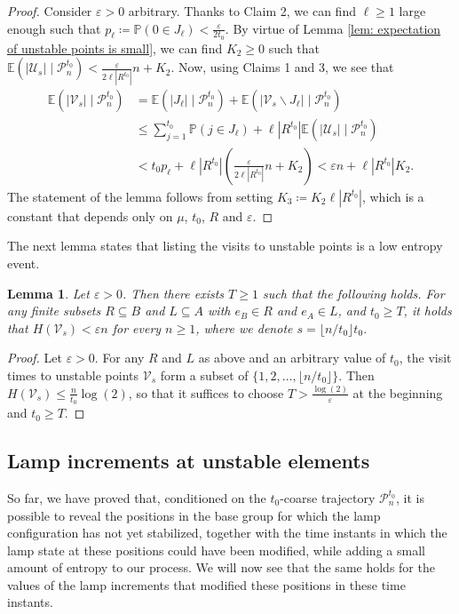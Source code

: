 \documentclass[reqno,oneside,11pt]{amsart}
\renewcommand{\P}{\mathbb{P}}
\newcommand{\E}{\mathbb{E}}
\theoremstyle{plain}
\newtheorem{lem}[thm]{Lemma}
\theoremstyle{definition}
\begin{document}
\begin{proof}
	Consider $\varepsilon>0$ arbitrary. Thanks to Claim 2, we can find $\ell\ge 1$ large enough such that $p_{\ell}\coloneqq \P(0\in J_\ell )<\frac{\varepsilon}{2t_0}.$
	By virtue of Lemma \ref{lem: expectation of unstable points is small}, we can find $K_2\ge 0$ such that $		\E(|\mathcal{U}_s|\mid \mathcal{P}_n^{t_0})<\frac{\varepsilon}{2\ell|R^{t_0}|} n + K_2$. Now, using Claims 1 and 3, we see that
	\begin{align*}
		\E\left(|\mathcal{V}_s|\mid \mathcal{P}_n^{t_0}\right) &=\E\left(|J_{\ell}|\mid \mathcal{P}_n^{t_0}\right)+\E\left(|\mathcal{V}_s\backslash J_{\ell}| \mid \mathcal{P}_n^{t_0}\right)\\
		&\le \sum_{j=1}^{t_0}\P(j\in J_{\ell}) + \ell|R^{t_0}| \E(|\mathcal{U}_s|\mid \mathcal{P}_n^{t_0})\\
		&< t_0p_{\ell}+ \ell|R^{t_0}|\left(\frac{\varepsilon}{2\ell|R^{t_0}|} n + K_2\right)<\varepsilon n +\ell |R^{t_0}| K_2.
	\end{align*}
	The statement of the lemma follows from setting $K_3\coloneqq K_2\ell |R^{t_0}|$, which is a constant that depends only on $\mu$, $t_0$, $R$ and $\varepsilon$.
\end{proof}
The next lemma states that listing the visits to unstable points is a low entropy event. 

\begin{lem}\label{lem: visit times to unstable points have small entropy} 
	Let $\varepsilon>0$. Then there exists $T\ge 1$ such that the following holds. For any finite subsets $R\subseteq B$ and $L\subseteq A$ with $e_B\in R$ and $e_A\in L$, and $t_0\ge T$, it holds that $H(\mathcal{V}_s)<\varepsilon n$ for every $n\ge 1$, where we denote $s=\lfloor n/t_0\rfloor t_0$.
\end{lem}
\begin{proof}
	Let $\varepsilon>0$. For any $R$ and $L$ as above and an arbitrary value of $t_0$, the visit times to unstable points $\mathcal{V}_s$ form a subset of $\{1,2,\ldots, \lfloor n/t_0\rfloor\}$. Then $H(\mathcal{V}_s)\le \frac{n}{t_0}\log(2)$, so that it suffices to choose $T>\frac{\log(2)}{\varepsilon}$ at the beginning and $t_0\ge T$.
\end{proof}

\subsection{Lamp increments at unstable elements}\label{subsection: lamp increments at unstable elements}
So far, we have proved that, conditioned on the $t_0$-coarse trajectory $\mathcal{P}_n^{t_0}$, it is possible to reveal the positions in the base group for which the lamp configuration has not yet stabilized, together with the time instants in which the lamp state at these positions could have been modified, while adding a small amount of entropy to our process. We will now see that the same holds for the values of the lamp increments that modified these positions in these time instants.
\end{document}
